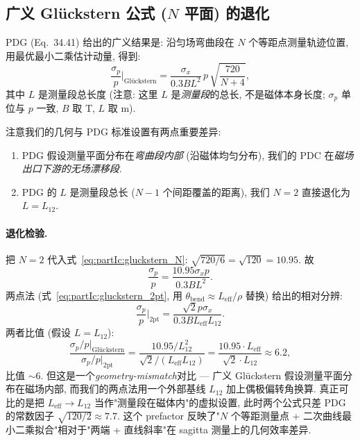 \subsection{广义 Glückstern 公式 ($N$ 平面) 的退化}

PDG (Eq.~34.41) 给出的广义结果是: 沿匀场弯曲段在 $N$ 个等距点测量轨迹位置, 用最优最小二乘估计动量, 得到:
\begin{equation}
  \frac{\sigma_p}{p} \bigg|_\mathrm{Glückstern}
  = \frac{\sigma_x}{0.3 B L^2}\, p \, \sqrt{\frac{720}{N + 4}},
  \label{eq:partIc:gluckstern_N}
\end{equation}
其中 $L$ 是测量段总长度 (注意: 这里 $L$ 是\emph{测量段}的总长, 不是磁体本身长度; $\sigma_p$ 单位与 $p$ 一致, $B$ 取 T, $L$ 取 m).

注意我们的几何与 PDG 标准设置有两点重要差异:
\begin{enumerate}[nosep, leftmargin=2em]
  \item PDG 假设测量平面分布在\emph{弯曲段内部} (沿磁体均匀分布), 我们的 PDC 在\emph{磁场出口下游的无场漂移段}.
  \item PDG 的 $L$ 是测量段总长 ($N-1$ 个间距覆盖的距离), 我们 $N=2$ 直接退化为 $L = L_{12}$.
\end{enumerate}

\paragraph{退化检验.} 把 $N=2$ 代入式~\eqref{eq:partIc:gluckstern_N}: $\sqrt{720 / 6} = \sqrt{120} = 10.95$. 故
\begin{equation}
  \frac{\sigma_p}{p} = \frac{10.95 \sigma_x p}{0.3 B L^2}.
\end{equation}
两点法 (式~\eqref{eq:partIc:gluckstern_2pt}, 用 $\theta_\mathrm{bend} \approx L_\mathrm{eff}/\rho$ 替换) 给出的相对分辨:
\begin{equation}
  \frac{\sigma_p}{p}\bigg|_\mathrm{2pt}
  = \frac{\sqrt 2 p \sigma_x}{0.3 B L_\mathrm{eff} L_{12}}.
\end{equation}
两者比值 (假设 $L = L_{12}$):
\begin{equation}
  \frac{\sigma_p/p|_\mathrm{Glückstern}}{\sigma_p/p|_\mathrm{2pt}}
  = \frac{10.95 / L_{12}^2}{\sqrt 2 / (L_\mathrm{eff} L_{12})}
  = \frac{10.95 \cdot L_\mathrm{eff}}{\sqrt 2 \cdot L_{12}}
  \approx 6.2,
\end{equation}
比值 $\sim 6$. 但这是一个\emph{geometry-mismatch}对比 — 广义 Glückstern 假设测量平面分布在磁场内部, 而我们的两点法用一个外部基线 $L_{12}$ 加上偶极偏转角换算. 真正可比的是把 $L_\mathrm{eff} \to L_{12}$ 当作"测量段在磁体内"的虚拟设置, 此时两个公式只差 PDG 的常数因子 $\sqrt{120/2} \approx 7.7$. 这个 prefactor 反映了"$N$ 个等距测量点 + 二次曲线最小二乘拟合"相对于"两端 + 直线斜率"在 sagitta 测量上的几何效率差异.

